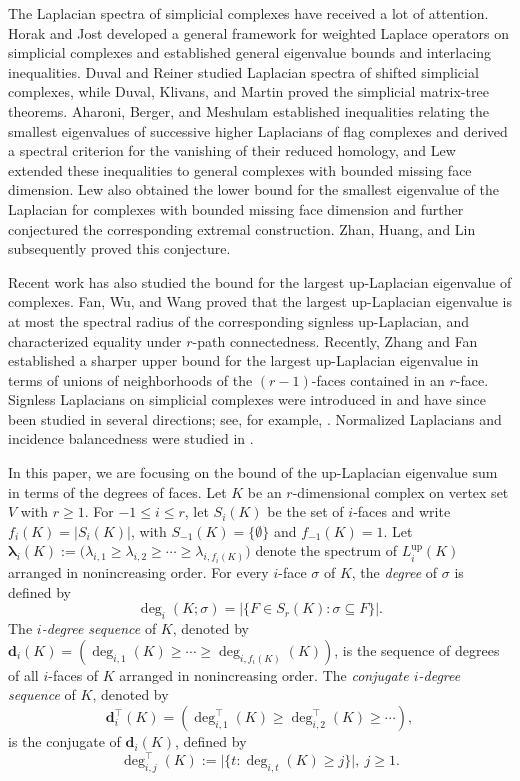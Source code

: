 \documentclass[12pt]{amsart}
\theoremstyle{plain}
\theoremstyle{definition}
\numberwithin{equation}{section}
\numberwithin{figure}{section}
\newcommand{\bflam}{\bm{\lambda}}
\newcommand{\dd}{\mathbf d}
\newcommand{\Lup}{L^{\operatorname{up}}}
\begin{document}
The Laplacian spectra of simplicial complexes have received a lot of attention.
Horak and Jost \cite{HJ2013a, HJ2013b} developed a general framework for weighted Laplace operators on simplicial complexes and established general eigenvalue bounds and interlacing inequalities.
Duval and Reiner \cite{DR2002} studied Laplacian spectra of shifted simplicial complexes, while Duval, Klivans, and Martin \cite{DKM2009} proved the simplicial matrix-tree theorems.
Aharoni, Berger, and Meshulam \cite{ABM2005} established inequalities relating the smallest eigenvalues of successive higher Laplacians of flag complexes and derived a spectral criterion for the vanishing of their reduced homology, and Lew \cite{L2020b} extended these inequalities to general complexes with bounded missing face dimension.
Lew \cite{L2020a} also obtained the lower bound for the smallest eigenvalue of the Laplacian for complexes with bounded missing face dimension and further conjectured the corresponding extremal construction.
Zhan, Huang, and Lin \cite{ZHL2026} subsequently proved this conjecture.

Recent work has also studied the bound for the largest up-Laplacian eigenvalue of complexes.
Fan, Wu, and Wang \cite{FWW2025} proved that the largest up-Laplacian eigenvalue is at most the spectral radius of the corresponding signless up-Laplacian, and characterized equality under $r$-path connectedness.
Recently, Zhang and Fan \cite{ZF2026b} established a sharper upper bound for the largest up-Laplacian eigenvalue in terms of unions of neighborhoods of the $(r - 1)$-faces contained in an $r$-face.
Signless Laplacians on simplicial complexes were introduced in \cite{KO2020} and have since been studied in several directions; see, for example, \cite{FSZ2025,FZ2026,L2014,SFS2026,ZF2026a}.
Normalized Laplacians and incidence balancedness were studied in \cite{SWF2025}.

In this paper, we are focusing on the bound of the up-Laplacian eigenvalue sum in terms of the degrees of faces.
Let $K$ be an $r$-dimensional complex on vertex set $V$ with $r \ge 1$.
For $-1 \leq i \leq r$, let $S_i(K)$ be the set of $i$-faces and write $f_i(K) = |S_i(K)|$, with $S_{-1}(K) = \{\emptyset\}$ and $f_{-1}(K) = 1$.
Let $\bflam_i(K):= \bigl(\lambda_{i,1} \ge \lambda_{i,2} \ge \cdots \ge \lambda_{i,f_i(K)}\bigr)$ denote the spectrum of $\Lup_{i}(K)$ arranged in nonincreasing order.
For every $i$-face $\sigma$ of $K$, the \emph{degree} of $\sigma$ is defined by
$$ \deg_i(K; \sigma)=|\{F \in S_r(K): \sigma \subseteq F\}|.$$
The \emph{$i$-degree sequence} of $K$, denoted by $\dd_i(K)=(\deg_{i,1}(K) \ge \cdots \ge \deg_{i,f_i(K)}(K))$, is the sequence of degrees of all $i$-faces of $K$ arranged in nonincreasing order.
The	\emph{conjugate $i$-degree sequence} of $K$, denoted by $$\dd_i^\top(K)=(\deg^\top_{i,1}(K) \ge \deg^\top_{i,2}(K) \ge \cdots),$$ is the conjugate of $\dd_i(K)$, defined by
\[
\deg^\top_{i,j}(K):=\bigl|\{t:\deg_{i,t}(K) \geq j\}\bigr|, ~ j \ge 1.
\]
\end{document}
